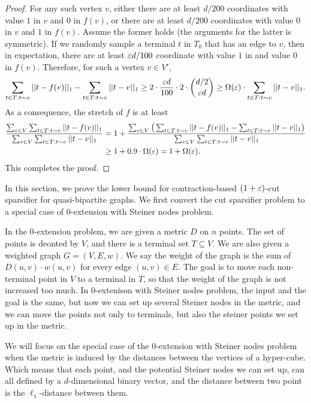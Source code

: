 \begin{proof}
For any such vertex $v$, either there are at least $d/200$ coordinates with value $1$ in $v$ and $0$ in $f(v)$, or there are at least $d/200$ coordinates with value $0$ in $v$ and $1$ in $f(v)$. Assume the former holds (the arguments for the latter is symmetric). 
If we randomly sample a terminal $t$ in $T_0$ that has an edge to $v$, then in expectation, there are at least ${\varepsilon} d/100$ coordinate with value $1$ in and value $0$ in $f(v)$. Therefore, for such a vertex $v\in V'$, $$\sum_{t\in T: t\sim v}||t-f(v)||_1-\sum_{t\in T: t\sim v}||t-v||_1\ge 2\cdot \frac{{\varepsilon} d}{100}\cdot 2\cdot \binom{d/2}{{\varepsilon} d} \ge \Omega({\varepsilon})\cdot \sum_{t\in T: t\sim v}||t-v||_1.$$
As a consequence, the stretch of $f$ is at least
\[
\begin{split}
\frac{\sum_{v\in V}\sum_{t\in T: t\sim v}||t-f(v)||_1}{\sum_{v\in V}\sum_{t\in T: t\sim v}||t-v||_1}
& =1+\frac{\sum_{v\in V}\big(\sum_{t\in T: t\sim v}||t-f(v)||_1-\sum_{t\in T: t\sim v}||t-v||_1\big)}{\sum_{v\in V}\sum_{t\in T: t\sim v}||t-v||_1}\\
& \ge 1+0.9\cdot \Omega({\varepsilon}) = 1+\Omega({\varepsilon}).
\end{split}
\]
This completes the proof.
\end{proof}







\iffalse

In this section, we prove the lower bound for contraction-based $(1+{\varepsilon})$-cut sparsifier for quasi-bipartite graphs. We first convert the cut sparsifier problem to a special case of $0$-extension with Steiner nodes problem.

In the 0-extension problem, we are given a metric $D$ on $n$ points. The set of points is deonted by $V$, and there is a terminal set $T \subseteq V$. We are also given a weighted graph $G=(V,E,w)$. We say the weight of the graph is the sum of $D(u,v)\cdot w(u,v)$ for every edge $(u,v)\in E$. The goal is to move each non-terminal point in $V$ to a terminal in $T$, so that the weight of the graph is not increased too much. In 0-extenison with Steiner nodes problem, the input and the goal is the same, but now we can set up several Steiner nodes in the metric, and we can move the points not only to terminals, but also the steiner points we set up in the metric. 

We will focus on the special case of the 0-extension with Steiner nodes problem when the metric is induced by the distances between the vertices of a hyper-cube. Which means that each point, and the potential Steiner nodes we can set up, can all defined by a $d$-dimensional binary vector, and the distance between two point is the $\ell_1$-distance between them.


